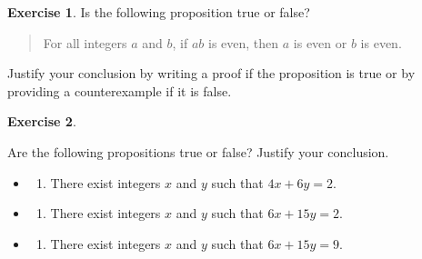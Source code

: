 \documentclass[
]{book}
\providecommand{\tightlist}{%
  \setlength{\itemsep}{0pt}\setlength{\parskip}{0pt}}
\theoremstyle{definition}
\theoremstyle{definition}
\theoremstyle{definition}
\newtheorem{exercise}{Exercise}[chapter]
\theoremstyle{definition}
\theoremstyle{remark}
\begin{document}
\begin{exercise}
\protect\hypertarget{exr:unnamed-chunk-144}{}\label{exr:unnamed-chunk-144}Is the following proposition true or false?

\begin{quote}
For all integers \(a\) and \(b\), if \(ab\) is even, then \(a\) is even or \(b\) is even.
\end{quote}

Justify your conclusion by writing a proof if the proposition is true or by providing a counterexample if it is false.
\end{exercise}

\begin{exercise}
\protect\hypertarget{exr:unnamed-chunk-145}{}\label{exr:unnamed-chunk-145}

Are the following propositions true or false? Justify your conclusion.

\begin{itemize}
\tightlist
\item
  \begin{enumerate}
  \def\labelenumi{(\alph{enumi})}
  \tightlist
  \item
    There exist integers \(x\) and \(y\) such that \(4x + 6y = 2\).
  \end{enumerate}
\item
  \begin{enumerate}
  \def\labelenumi{(\alph{enumi})}
  \setcounter{enumi}{1}
  \tightlist
  \item
    There exist integers \(x\) and \(y\) such that \(6x + 15y = 2\).
  \end{enumerate}
\item
  \begin{enumerate}
  \def\labelenumi{(\alph{enumi})}
  \setcounter{enumi}{2}
  \tightlist
  \item
    There exist integers \(x\) and \(y\) such that \(6x + 15y = 9\).
  \end{enumerate}
\end{itemize}

\end{exercise}

  
\end{document}
